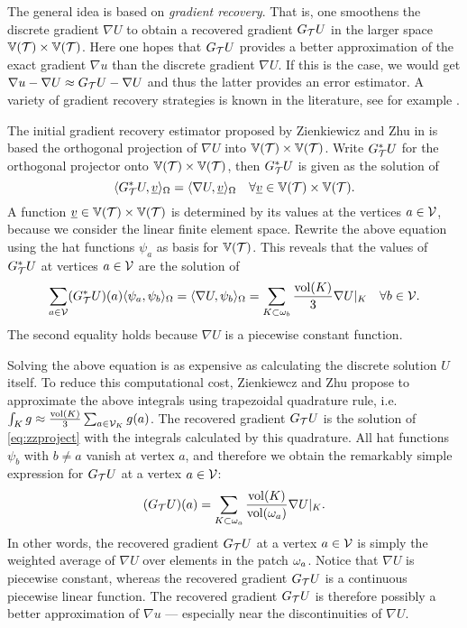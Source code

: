 \documentclass[thesis.tex]{subfiles}
\begin{document}
The general idea is based on \emph{gradient recovery}. That is, one smoothens the discrete gradient $\nabla U$ to obtain a
recovered gradient $G_{\mathcal{T}} U$ in the larger space $\mathbb{V}(\mathcal{T}) \times \mathbb{V}(\mathcal{T})$. Here
one hopes that $G_{\mathcal{T}} U$ provides a better approximation of the exact gradient $\nabla u$ than the discrete gradient $\nabla U$.
If this is the case, we would get $\nabla u - \nabla U \approx G_{\mathcal{T}} U - \nabla U$ and thus the latter provides
an error estimator.  
A variety of gradient recovery strategies is known in the literature, see for example \cite{zienkiewicz1992superconvergent}. 

The initial gradient recovery estimator proposed by Zienkiewicz and Zhu in \cite{zienkiewicz1987simple} is based
the orthogonal projection of $\nabla U$ into $\mathbb{V}(\mathcal{T}) \times \mathbb{V}(\mathcal{T})$. Write $G_{\mathcal{T}}^*U$ for the orthogonal
projector onto $\mathbb{V}(\mathcal{T}) \times \mathbb{V}(\mathcal{T})$, then $G_{\mathcal{T}}^*U$ is given as the solution of
\[
  \langle G_{\mathcal{T}}^*U, \underline{v}  \rangle_\Omega = \langle \nabla U,\underline{v} \rangle_\Omega \quad \forall \underline{v} \in \mathbb{V}(\mathcal{T}) \times \mathbb{V}(\mathcal{T}).
\]
A function $\underline{v} \in \mathbb{V}(\mathcal{T}) \times \mathbb{V}(\mathcal{T})$ is determined by its values at the vertices $a \in \mathcal{V}$,
because we consider the linear finite element space. Rewrite the above equation using the hat functions $\psi_a$ as basis for $\mathbb{V}(\mathcal{T})$.
This reveals that the values of $G_{\mathcal{T}}^*U$ at vertices $a \in \mathcal{V}$  are the solution of 
\begin{equation}
  \label{eq:zzproject}
  \sum_{a \in \mathcal{V}} (G_{\mathcal{T}}^* U)(a) \langle \psi_a, \psi_b \rangle_\Omega = \langle \nabla U, \psi_b \rangle_{\Omega} = \sum_{K \subset \omega_b} \frac{\operatorname{vol}(K)}{3} \nabla U|_K \quad \forall b \in \mathcal{V}.
\end{equation}
The second equality holds because $\nabla U$ is a piecewise constant function.

Solving the above equation is as expensive as calculating the discrete solution $U$ itself. To
reduce this computational cost, Zienkiewcz and Zhu \cite{zienkiewicz1987simple} propose to approximate the
above integrals using trapezoidal quadrature rule, i.e. $\int_K g \approx \frac{\operatorname{vol}(K)}{3} \sum_{a \in \mathcal{V}_K} g(a)$. 
The recovered gradient $G_{\mathcal{T}} U$ is the solution of \eqref{eq:zzproject} with the integrals calculated by this quadrature.
All hat functions $\psi_b$ with $b\ne a$ vanish at vertex $a$, and therefore we obtain the remarkably simple expression
for $G_{\mathcal{T}} U$ at a vertex $a \in \mathcal{V}$:
\[
  (G_{\mathcal{T}} U)(a) = \sum_{K \subset \omega_a} \frac{\operatorname{vol}(K)}{\operatorname{vol}(\omega_a)} \nabla U|_K.
\]
In other words, the recovered gradient $G_{\mathcal{T}} U$ at a vertex $a \in \mathcal{V}$ is simply the weighted average of $\nabla U$ over
elements in the patch $\omega_a$. Notice that $\nabla U$ is piecewise constant, whereas
the recovered gradient $G_{\mathcal{T}} U$ is a continuous piecewise linear function. The recovered gradient $G_{\mathcal{T}} U$ is 
therefore possibly a better approximation of $\nabla u$ --- especially near the discontinuities of $\nabla U$.
\end{document}
